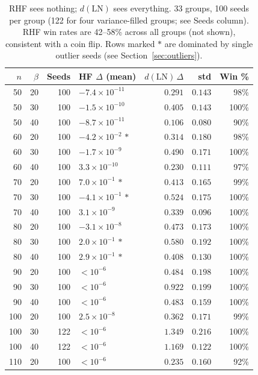 \documentclass[journal=cic,version=preprint]{iacrj}
\begin{document}
\begin{table}[tbp]
\centering
\caption{RHF sees nothing; $d(\mathrm{LN})$ sees everything. 33 groups, 100 seeds per group (122 for four variance-filled groups; see Seeds column). RHF win rates are 42--58\% across all groups (not shown), consistent with a coin flip. Rows marked $\ast$ are dominated by single outlier seeds (see Section~\ref{sec:outliers}).\label{tab:main}}
\small
\begin{tabular}{rrrlrrr}
\hline
$n$ & $\beta$ & Seeds & HF $\Delta$ (mean) & $d(\mathrm{LN})\,\Delta$ & std & Win \% \\
\hline
50  & 20 & 100 & $-7.4\times 10^{-11}$ & $0.291$  & $0.143$ & 98\% \\
50  & 30 & 100 & $-1.5\times 10^{-10}$ & $0.405$  & $0.143$ & 100\% \\
50  & 40 & 100 & $-8.7\times 10^{-11}$ & $0.106$  & $0.080$ & 90\% \\
60  & 20 & 100 & $-4.2\times 10^{-2}\,\ast$ & $0.314$ & $0.180$ & 98\% \\
60  & 30 & 100 & $-1.7\times 10^{-9}$  & $0.490$  & $0.171$ & 100\% \\
60  & 40 & 100 & $3.3\times 10^{-10}$  & $0.230$  & $0.111$ & 97\% \\
70  & 20 & 100 & $7.0\times 10^{-1}\,\ast$ & $0.413$  & $0.165$ & 99\% \\
70  & 30 & 100 & $-4.1\times 10^{-1}\,\ast$ & $0.524$  & $0.175$ & 100\% \\
70  & 40 & 100 & $3.1\times 10^{-9}$   & $0.339$  & $0.096$ & 100\% \\
80  & 20 & 100 & $-3.1\times 10^{-8}$  & $0.473$  & $0.173$ & 100\% \\
80  & 30 & 100 & $2.0\times 10^{-1}\,\ast$  & $0.580$  & $0.192$ & 100\% \\
80  & 40 & 100 & $2.9\times 10^{-1}\,\ast$  & $0.408$  & $0.130$ & 100\% \\
90  & 20 & 100 & $<10^{-6}$ & $0.484$  & $0.198$ & 100\% \\
90  & 30 & 100 & $<10^{-6}$ & $0.922$  & $0.199$ & 100\% \\
90  & 40 & 100 & $<10^{-6}$ & $0.483$  & $0.159$ & 100\% \\
100 & 20 & 100 & $2.5\times 10^{-8}$   & $0.362$  & $0.171$ & 99\% \\
100 & 30 & 122 & $<10^{-6}$ & $1.349$  & $0.216$ & 100\% \\
100 & 40 & 122 & $<10^{-6}$ & $1.169$  & $0.122$ & 100\% \\
110 & 20 & 100 & $<10^{-6}$ & $0.235$  & $0.160$ & 92\% \\

\end{tabular}
\end{table}
\end{document}
